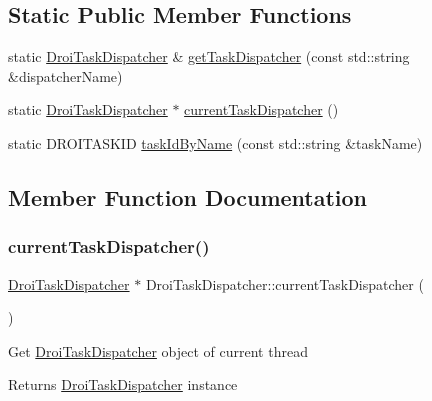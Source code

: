 \subsection*{Static Public Member Functions}
\begin{DoxyCompactItemize}
\item 
static \hyperlink{class_droi_task_dispatcher}{Droi\+Task\+Dispatcher} \& \hyperlink{class_droi_task_dispatcher_ae21fccf452591c290b429f3417350857}{get\+Task\+Dispatcher} (const std\+::string \&dispatcher\+Name)
\item 
static \hyperlink{class_droi_task_dispatcher}{Droi\+Task\+Dispatcher} $\ast$ \hyperlink{class_droi_task_dispatcher_ade17a036d0f01db63f8fab82b53136d6}{current\+Task\+Dispatcher} ()
\item 
static D\+R\+O\+I\+T\+A\+S\+K\+ID \hyperlink{class_droi_task_dispatcher_aa535e2418acecf3b6f26772f3b1a0091}{task\+Id\+By\+Name} (const std\+::string \&task\+Name)
\end{DoxyCompactItemize}


\subsection{Member Function Documentation}
\mbox{\label{class_droi_task_dispatcher_ade17a036d0f01db63f8fab82b53136d6}} 
\subsubsection{\texorpdfstring{current\+Task\+Dispatcher()}{currentTaskDispatcher()}}
{\footnotesize\ttfamily \hyperlink{class_droi_task_dispatcher}{Droi\+Task\+Dispatcher} $\ast$ Droi\+Task\+Dispatcher\+::current\+Task\+Dispatcher (\begin{DoxyParamCaption}{ }\end{DoxyParamCaption})\hspace{0.3cm}{\ttfamily [static]}}

Get \hyperlink{class_droi_task_dispatcher}{Droi\+Task\+Dispatcher} object of current thread \begin{DoxyReturn}{Returns}
\hyperlink{class_droi_task_dispatcher}{Droi\+Task\+Dispatcher} instance 
\end{DoxyReturn}


